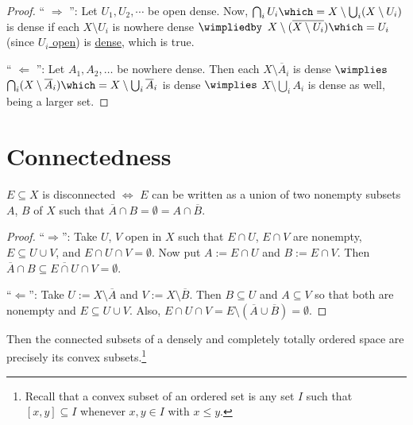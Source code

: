 	\begin{proof}
		`` $\Rightarrow$ '': Let $U_1, U_2, \cdots$ be open dense. Now, $\bigcap_i U_i \which= X\setminus\bigcup_i(X\setminus U_i)$ is dense if each $X\setminus U_i$ is nowhere dense $\wimpliedby$ $X\setminus(\overline{X\setminus U_i})\which= U_i$ (since \uline{$U_i$ open}) is \uline{dense}, which is true.
		
		`` $\Leftarrow$ '': Let $A_1, A_2, \ldots$ be nowhere dense. Then each $X\setminus\overline A_i$ is dense $\wimplies$ $\bigcap_i(X\setminus \overline A_i)\which= X\setminus\bigcup_i\overline A_i$ is dense $\wimplies$ $X\setminus\bigcup_i A_i$ is dense as well, being a larger set.
	\end{proof}
	
	
	
	
\section{Connectedness}

	\begin{lem}
		$E\subseteq X$ is disconnected $\iff$ $E$ can be written as a union of two nonempty subsets $A$, $B$ of $X$ such that $\overline A\cap B = \emptyset = A\cap\overline B$.
	\end{lem}
	
	\begin{proof}
		``$\Rightarrow$'': Take $U$, $V$ open in $X$ such that $E\cap U$, $E\cap V$ are nonempty, $E\subseteq U\cup V$, and $E\cap U\cap V = \emptyset$. Now put $A := E\cap U$ and $B := E\cap V$. Then $\overline A\cap B\subseteq \overline{E\cap U}\cap V = \emptyset$.
		
		``$\Leftarrow$'': Take $U := X\setminus \overline A$ and $V := X\setminus \overline B$. Then $B\subseteq U$ and $A\subseteq V$ so that both are nonempty and $E\subseteq U\cup V$. Also, $E\cap U\cap V = E\setminus(\overline A\cup\overline B) = \emptyset$.
	\end{proof}
	
	\begin{prp}\label{PRP: linear continua are connected}
		Then the connected subsets of a densely and completely totally ordered space are precisely its convex subsets.\footnote{Recall that a convex subset of an ordered set is any set $I$ such that $[x, y]\subseteq I$ whenever $x, y\in I$ with $x\le y$.}
	\end{prp}
	
